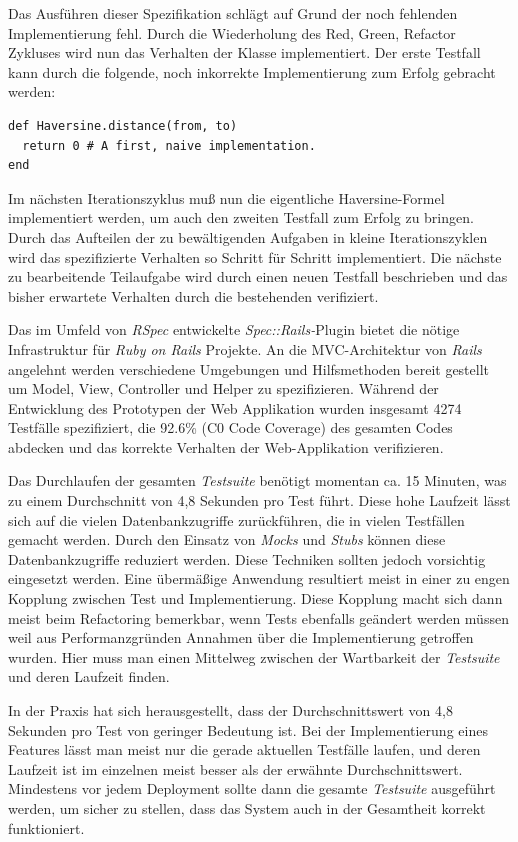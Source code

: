 Das Ausführen dieser Spezifikation schlägt auf Grund der noch
fehlenden Implementierung fehl. Durch die Wiederholung des Red, Green,
Refactor Zykluses wird nun das Verhalten der Klasse implementiert. Der
erste Testfall kann durch die folgende, noch inkorrekte
Implementierung zum Erfolg gebracht werden:

\begin{lstlisting}[]
def Haversine.distance(from, to)
  return 0 # A first, naive implementation.
end
\end{lstlisting}

Im nächsten Iterationszyklus muß nun die eigentliche Haversine-Formel
\cite{wiki:haversine} implementiert werden, um auch den zweiten
Testfall zum Erfolg zu bringen. Durch das Aufteilen der zu
bewältigenden Aufgaben in kleine Iterationszyklen wird das
spezifizierte Verhalten so Schritt für Schritt implementiert. Die
nächste zu bearbeitende Teilaufgabe wird durch einen neuen Testfall
beschrieben und das bisher erwartete Verhalten durch die bestehenden
verifiziert.

Das im Umfeld von \textit{RSpec} entwickelte
\textit{Spec::Rails-}Plugin bietet die nötige Infrastruktur für
\textit{Ruby on Rails} Projekte. An die MVC-Architektur von
\textit{Rails} angelehnt werden verschiedene Umgebungen und
Hilfsmethoden bereit gestellt um Model, View, Controller und Helper zu
spezifizieren. Während der Entwicklung des Prototypen der Web
Applikation wurden insgesamt 4274 Testfälle spezifiziert, die 92.6\%
(C0 Code Coverage) des gesamten Codes abdecken und das korrekte
Verhalten der Web-Applikation verifizieren.

Das Durchlaufen der gesamten \textit{Testsuite} benötigt momentan
ca. 15 Minuten, was zu einem Durchschnitt von 4,8 Sekunden pro Test
führt. Diese hohe Laufzeit lässt sich auf die vielen Datenbankzugriffe
zurückführen, die in vielen Testfällen gemacht werden. Durch den
Einsatz von \textit{Mocks} und \textit{Stubs} können diese
Datenbankzugriffe reduziert werden. Diese Techniken sollten jedoch
vorsichtig eingesetzt werden. Eine übermäßige Anwendung resultiert
meist in einer zu engen Kopplung zwischen Test und
Implementierung. Diese Kopplung macht sich dann meist beim Refactoring
bemerkbar, wenn Tests ebenfalls geändert werden müssen weil aus
Performanzgründen Annahmen über die Implementierung getroffen
wurden. Hier muss man einen Mittelweg zwischen der Wartbarkeit der
\textit{Testsuite} und deren Laufzeit finden.

In der Praxis hat sich herausgestellt, dass der Durchschnittswert von
4,8 Sekunden pro Test von geringer Bedeutung ist. Bei der
Implementierung eines Features lässt man meist nur die gerade
aktuellen Testfälle laufen, und deren Laufzeit ist im einzelnen meist
besser als der erwähnte Durchschnittswert. Mindestens vor jedem
Deployment sollte dann die gesamte \textit{Testsuite} ausgeführt werden, um
sicher zu stellen, dass das System auch in der Gesamtheit korrekt
funktioniert.

